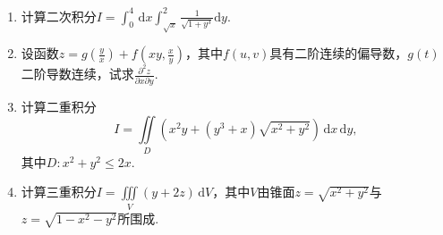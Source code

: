 \documentclass[../main.tex]{subfiles}
\begin{document}
\begin{enumerate}
    \item 计算二次积分$I=\int_{0}^{4}\,\mathrm{d}x\int_{\sqrt{x}}^{2}\frac{1}{\sqrt{1+y^{3}}}
              \mathrm{d}y$.
          \vspace{12em}

    \item 设函数$z=g\left(\frac{y}{x}\right)+f\left(xy,\frac{x}{y}\right)$，其中$f
              (u,v)$具有二阶连续的偏导数，$g(t)$二阶导数连续，试求$\frac{\partial^{2} z}{\partial
                  x \partial y}$.
          \vspace{10em}

    \item 计算二重积分
          \[
              I=\iint\limits_{D}\left(x^{2} y+\left(y^{3}+x\right)\sqrt{x^{2}+y^{2}}\right
              )\,\mathrm{d}x\,\mathrm{d}y,
          \]
          其中$D:x^{2}+y^{2}\leq 2x$.
          \vspace{10em}

    \item 计算三重积分$I=\iiint\limits_{V}(y+2z)\,\mathrm{d}V$，其中$V$由锥面$z=\sqrt{x^{2}+y^{2}}$与$z
              =\sqrt{1-x^{2}-y^{2}}$所围成.
          \vspace{10em}
\end{enumerate}
\end{document}
